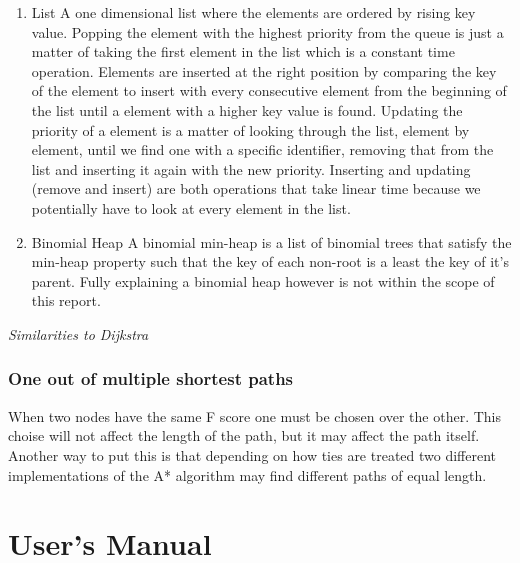 \documentclass[12pt, a4paper]{article}
\begin{document}
\begin{enumerate}
\item{List}
A one dimensional list where the elements are ordered by rising key value. Popping the element with the highest priority from the queue is just a matter of taking the first element in the list which is a constant time operation. Elements are inserted at the right position by comparing the key of the element to insert with every consecutive element from the beginning of the list until a element with a higher key value is found. Updating the priority of a element is a matter of looking through the list, element by element, until we find one with a specific identifier, removing that from the list and inserting it again with the new priority. Inserting and updating (remove and insert) are both operations that take linear time because we potentially have to look at every element in the list.

\item{Binomial Heap}
A binomial min-heap is a list of binomial trees that satisfy the min-heap property such that the key of each non-root is a least the key of it's parent.  Fully explaining a binomial heap however is not within the scope of this report. 

\end{enumerate}

\textit{Similarities to Dijkstra}




\subsubsection{One out of multiple shortest paths}

When two nodes have the same F score one must be chosen over the other. This
choise will not affect the length of the path, but it may affect the path
itself. Another way to put this is that depending on how ties are treated two
different implementations of the A* algorithm may find different paths of equal
length. \cite{astar2}


\section{User's Manual}
\end{document}
